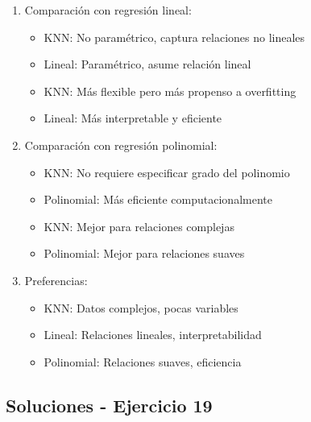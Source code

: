 \documentclass[12pt]{article}
\begin{document}
\begin{enumerate}
    \item Comparación con regresión lineal:
    \begin{itemize}
        \item KNN: No paramétrico, captura relaciones no lineales
        \item Lineal: Paramétrico, asume relación lineal
        \item KNN: Más flexible pero más propenso a overfitting
        \item Lineal: Más interpretable y eficiente
    \end{itemize}
    \item Comparación con regresión polinomial:
    \begin{itemize}
        \item KNN: No requiere especificar grado del polinomio
        \item Polinomial: Más eficiente computacionalmente
        \item KNN: Mejor para relaciones complejas
        \item Polinomial: Mejor para relaciones suaves
    \end{itemize}
    \item Preferencias:
    \begin{itemize}
        \item KNN: Datos complejos, pocas variables
        \item Lineal: Relaciones lineales, interpretabilidad
        \item Polinomial: Relaciones suaves, eficiencia
    \end{itemize}
\end{enumerate}

\subsection{Soluciones - Ejercicio 19}
\end{document}
